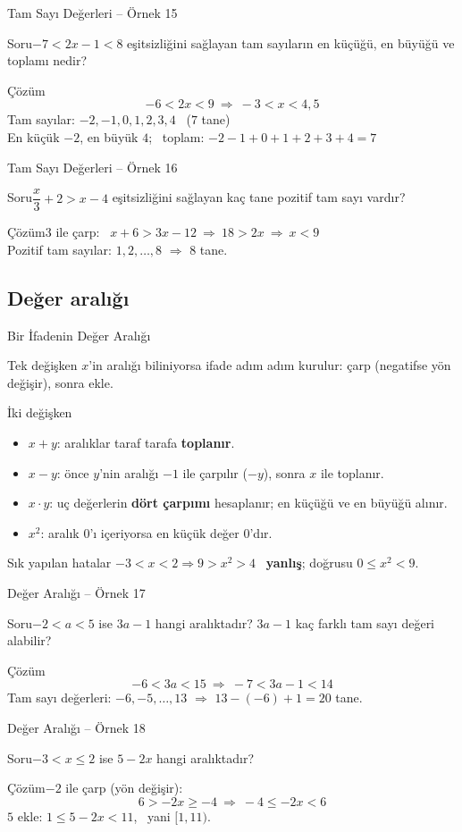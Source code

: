 \documentclass[aspectratio=169,11pt,handout]{beamer}
\newcommand{\soru}[3]{%
\begin{frame}{#1}
  \begin{block}{Soru}\large #2\end{block}
  \pause
  \begin{exampleblock}{Çözüm}\large #3\end{exampleblock}
\end{frame}}
\begin{document}
\soru{Tam Sayı Değerleri -- Örnek 15}
{\(-7<2x-1<8\) eşitsizliğini sağlayan tam sayıların en küçüğü, en büyüğü ve toplamı nedir?}
{\[-6<2x<9\ \Rightarrow\ -3<x<4{,}5\]
Tam sayılar: \(-2,-1,0,1,2,3,4\) \ (\(7\) tane)\\[3pt]
En küçük \(-2\), en büyük \(4\); \ toplam: \(-2-1+0+1+2+3+4=7\)}

\soru{Tam Sayı Değerleri -- Örnek 16}
{\(\dfrac x3+2>x-4\) eşitsizliğini sağlayan kaç tane pozitif tam sayı vardır?}
{\(3\) ile çarp: \ \(x+6>3x-12\ \Rightarrow\ 18>2x\ \Rightarrow\ x<9\)\\[4pt]
Pozitif tam sayılar: \(1,2,\dots,8\) \(\Rightarrow\) \(8\) tane.}

\subsection{Değer aralığı}
\begin{frame}{Bir İfadenin Değer Aralığı}
\begin{block}{Tek değişken}
\(x\)'in aralığı biliniyorsa ifade adım adım kurulur: çarp (negatifse yön değişir), sonra ekle.
\end{block}
\begin{block}{İki değişken}
\begin{itemize}
\item \(x+y\): aralıklar taraf tarafa \textbf{toplanır}.
\item \(x-y\): önce \(y\)'nin aralığı \(-1\) ile çarpılır (\(-y\)), sonra \(x\) ile toplanır.
\item \(x\cdot y\): uç değerlerin \textbf{dört çarpımı} hesaplanır; en küçüğü ve en büyüğü alınır.
\item \(x^2\): aralık \(0\)'ı içeriyorsa en küçük değer \(0\)'dır.
\end{itemize}
\end{block}
\begin{alertblock}{Sık yapılan hatalar}
\(-3<x<2\Rightarrow 9>x^2>4\) \ \textbf{yanlış}; doğrusu \(0\le x^2<9\).
\end{alertblock}
\end{frame}

\soru{Değer Aralığı -- Örnek 17}
{\(-2<a<5\) ise \(3a-1\) hangi aralıktadır? \(3a-1\) kaç farklı tam sayı değeri alabilir?}
{\[-6<3a<15\ \Rightarrow\ -7<3a-1<14\]
Tam sayı değerleri: \(-6,-5,\dots,13\) \(\Rightarrow\) \(13-(-6)+1=20\) tane.}

\soru{Değer Aralığı -- Örnek 18}
{\(-3<x\le 2\) ise \(5-2x\) hangi aralıktadır?}
{\(-2\) ile çarp (yön değişir):
\[6>-2x\ge -4\ \Rightarrow\ -4\le -2x<6\]
\(5\) ekle: \quad \(1\le 5-2x<11\), \ yani \([1,11)\).}
\end{document}
